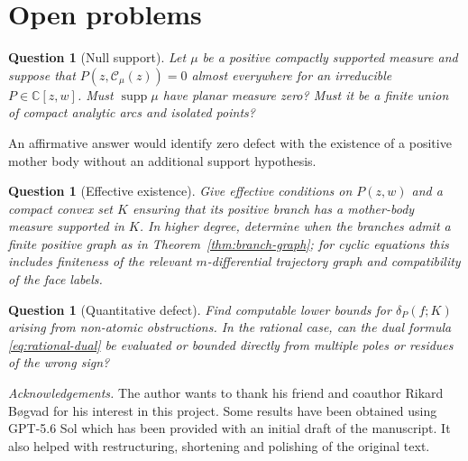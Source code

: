 \documentclass[reqno]{amsart}
\newtheorem{question}[theorem]{Question}
\theoremstyle{definition}
\theoremstyle{remark}
\newcommand{\bC}{\mathbb C}
\newcommand{\Cauchy}{\mathcal C}
\newcommand{\supp}{\operatorname{supp}}
\begin{document}
\section{Open problems}\label{sec:open}

\begin{question}[Null support]\label{q:null-support}
Let $\mu$ be a positive compactly supported measure and suppose that
$P(z,\Cauchy_\mu(z))=0$ almost everywhere for an irreducible
$P\in\bC[z,w]$.  Must $\supp\mu$ have planar measure zero?  Must it be a finite
union of compact analytic arcs and isolated points?
\end{question}

An affirmative answer would identify zero defect with the existence of a
positive mother body without an additional support hypothesis.

\begin{question}[Effective existence]
Give effective conditions on $P(z,w)$ and a compact convex set $K$ ensuring
that its positive branch has a mother-body measure supported in $K$.  In higher
degree, determine when the branches admit a finite positive graph as in
Theorem~\ref{thm:branch-graph}; for cyclic equations this includes finiteness of
the relevant $m$-differential trajectory graph and compatibility of the face
labels.
\end{question}

\begin{question}[Quantitative defect]
Find computable lower bounds for $\delta_P(f;K)$ arising from non-atomic
obstructions.  In the rational case, can the dual formula
\eqref{eq:rational-dual} be evaluated or bounded directly from multiple poles
or residues of the wrong sign?
\end{question}

\medskip\noindent
\emph{Acknowledgements.} The author wants to thank his friend and coauthor Rikard B\o gvad for his interest in this project. Some results have been obtained using GPT-5.6 Sol which has been provided with an initial draft of the manuscript. It also helped with restructuring, shortening and polishing of the original text.   
\end{document}
